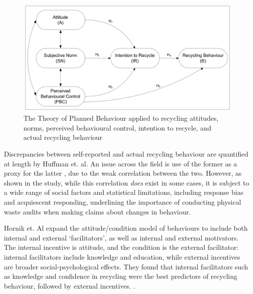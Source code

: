 \documentclass[nofonts,nols,justified,nobib]{tufte-book}
\begin{document}
\begin{figure}
\includegraphics[width=\textwidth]{img/1/tpb-recycling.png}
\caption{The Theory of Planned Behaviour applied to recycling attitudes, norms, perceived behavioural control, intention to recycle, and actual recycling behaviour \cite{strydom_applying_2018}}
\end{figure}

Discrepancies between self-reported and actual recycling behaviour are quantified at length by Huffman et. al. An issue across the field is use of the former as a proxy for the latter \cite{varotto_psychological_2017, huffman_when_2014}, due to the weak correlation between the two. However, as shown in the study, while this correlation \emph{does} exist in some cases, it is subject to a wide range of social factors and statistical limitations, including response bias and acquiescent responding, underlining the importance of conducting physical waste audits when making claims about changes in behaviour.

Hornik et. Al expand the attitude/condition model of behaviours to include both internal and external `facilitators', as well as internal and external motivators. The internal incentive is attitude, and the condition is the external facilitator: internal facilitators include knowledge and education, while external incentives are broader social-psychological effects. They found that internal facilitators such as knowledge and confidence in recycling were the best predictors of recycling behaviour, followed by external incentives. \cite{hornik_determinants_1995}. 
\end{document}
